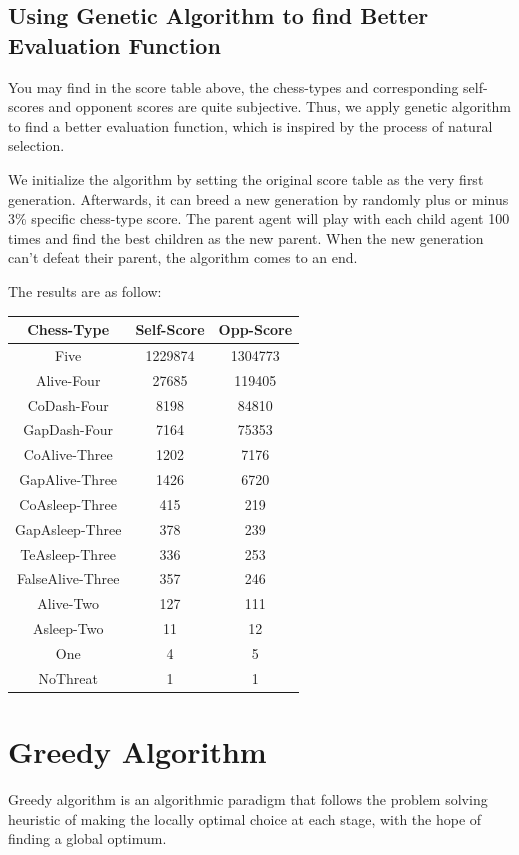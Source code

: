 \documentclass[12pt,a4paper]{article}
\begin{document}
\subsection{Using Genetic Algorithm to find Better Evaluation Function}
You may find in the score table above, the chess-types and corresponding self-scores and opponent scores are quite subjective. Thus, we apply genetic algorithm to find a better evaluation function, which is inspired by the process of natural selection\cite{ml}.

We initialize the algorithm by setting the original score table as the very first generation. Afterwards, it can breed a new generation by randomly plus or minus 3\% specific chess-type score. The parent agent will play with each child agent 100 times and find the best children as the new parent. When the new generation can't defeat their parent, the algorithm comes to an end.

The results are as follow:
\begin{table}[h]
\centering
\begin{tabular}{c|c|c}
\hline
Chess-Type&Self-Score&Opp-Score  \\
\hline
Five&1229874&1304773\\
Alive-Four&27685&119405\\
CoDash-Four&8198&84810\\
GapDash-Four&7164&75353\\
CoAlive-Three&1202&7176\\
GapAlive-Three&1426&6720\\
CoAsleep-Three&415&219\\
GapAsleep-Three&378&239\\
TeAsleep-Three&336&253\\
FalseAlive-Three&357&246\\
Alive-Two&127&111\\
Asleep-Two&11&12\\
One&4&5\\
NoThreat&1&1\\
\hline
\end{tabular}
\end{table}


\section{Greedy Algorithm}
Greedy algorithm is an algorithmic paradigm that follows the problem solving heuristic of making the locally optimal choice at each stage, with the hope of finding a global optimum.
\end{document}
